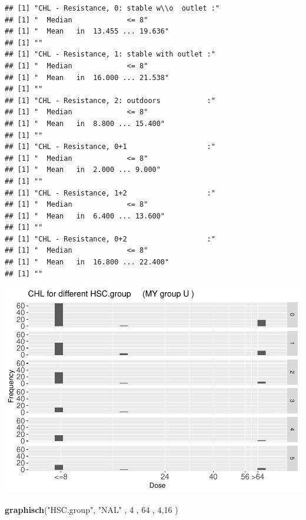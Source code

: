 \documentclass[
]{article}
\newenvironment{Shaded}{\begin{snugshade}}{\end{snugshade}}
\newcommand{\DecValTok}[1]{\textcolor[rgb]{0.00,0.00,0.81}{#1}}
\newcommand{\KeywordTok}[1]{\textcolor[rgb]{0.13,0.29,0.53}{\textbf{#1}}}
\newcommand{\NormalTok}[1]{#1}
\newcommand{\StringTok}[1]{\textcolor[rgb]{0.31,0.60,0.02}{#1}}
\begin{document}
\begin{verbatim}
## [1] "CHL - Resistance, 0: stable w\\o  outlet :"
## [1] "  Median             <= 8"
## [1] "  Mean   in  13.455 ... 19.636"
## [1] ""
## [1] "CHL - Resistance, 1: stable with outlet :"
## [1] "  Median             <= 8"
## [1] "  Mean   in  16.000 ... 21.538"
## [1] ""
## [1] "CHL - Resistance, 2: outdoors           :"
## [1] "  Median             <= 8"
## [1] "  Mean   in  8.800 ... 15.400"
## [1] ""
## [1] "CHL - Resistance, 0+1                   :"
## [1] "  Median             <= 8"
## [1] "  Mean   in  2.000 ... 9.000"
## [1] ""
## [1] "CHL - Resistance, 1+2                   :"
## [1] "  Median             <= 8"
## [1] "  Mean   in  6.400 ... 13.600"
## [1] ""
## [1] "CHL - Resistance, 0+2                   :"
## [1] "  Median             <= 8"
## [1] "  Mean   in  16.800 ... 22.400"
## [1] ""
\end{verbatim}

\includegraphics{Verteilungen_files/figure-latex/unnamed-chunk-52-1.pdf}

\begin{Shaded}
\begin{Highlighting}[]
   \KeywordTok{graphisch}\NormalTok{(}\StringTok{"HSC.group"}\NormalTok{, }\StringTok{"NAL"}\NormalTok{ , }\DecValTok{4}\NormalTok{    ,  }\DecValTok{64}\NormalTok{   ,   }\DecValTok{4}\NormalTok{,}\DecValTok{16}\NormalTok{   ) }
\end{Highlighting}
\end{Shaded}
\end{document}
